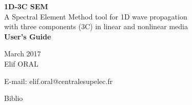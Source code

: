 \documentclass[letterpaper,11pt,titlepage,final]{report}
\def\MonthYear{March 2017}
\begin{document}
\parindent 0pt
\parskip 10pt


\thispagestyle{empty}
\vspace*{\fill}
\begin{center}


\vspace*{1mm}
{\Huge\bf{ 1D-3C SEM}}\\[5mm]
{\Large A Spectral Element Method tool for 1D wave propagation }\\
{\Large with three components (3C) in linear and nonlinear media}\\[2mm] 
{\Large \bf{User's Guide}}


\vspace*{3cm}
\fdunB
\MonthYear \\[3cm]
Elif ORAL\\[2mm]
{\small

E-mail: elif.oral@centralesupelec.fr \\
}
\end{center}
\vfill
\thispagestyle{empty}
\hspace*{0pt}
\newpage
\thispagestyle{empty}
\vspace*{\fill}


\newpage
{\parskip 0pt
  \tableofcontents
}
\newpage








 {Biblio}
\end{document}
